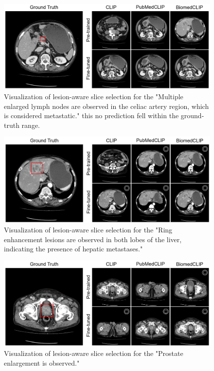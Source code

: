 \documentclass[bioengineering,article,submit,pdftex,moreauthors]{Definitions/mdpi}
\begin{document}
\begin{figure}[ht]
  \centering
  \includegraphics[width=1\textwidth]{./figures/app_lesion_aware_inst7_2.png}
  \caption{Visualization of lesion-aware slice selection for the "Multiple enlarged lymph nodes are observed in the celiac artery region, which is considered metastatic."
   this  no prediction fell within the ground-truth range.}
  \label{fig:lesion_aware_inst7}
\end{figure}


\begin{figure}[ht]
  \centering
  \includegraphics[width=1\textwidth]{./figures/app_lesion_aware_inst8_2.png}
  \caption{Visualization of lesion-aware slice selection for the "Ring enhancement lesions are observed in both lobes of the liver, indicating the presence of hepatic metastases."}
  \label{fig:lesion_aware_inst8}
\end{figure}


\begin{figure}[ht]
  \centering
  \includegraphics[width=1\textwidth]{./figures/app_lesion_aware_inst10_2.png}
  \caption{Visualization of lesion-aware slice selection for the  "Prostate enlargement is observed."}
  \label{fig:lesion_aware_inst10}
\end{figure}
\end{document}
